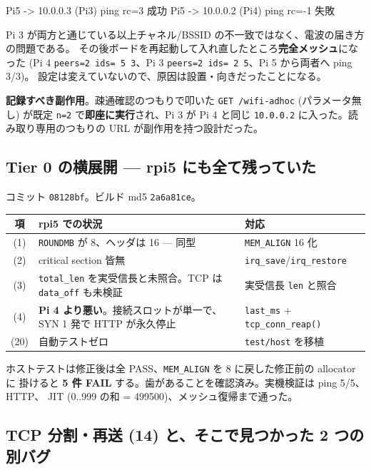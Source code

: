 \documentclass[a4paper,11pt]{ltjsarticle}
\begin{document}
\begin{code}
Pi5 -> 10.0.0.3 (Pi3)  ping rc=3   成功
Pi5 -> 10.0.0.2 (Pi4)  ping rc=-1  失敗
\end{code}

Pi 3 が両方と通じている以上チャネル/BSSID の不一致ではなく、電波の届き方の問題である。
その後ボードを再起動して入れ直したところ\textbf{完全メッシュ}になった
(Pi 4 \texttt{peers=2 ids= 5 3}、Pi 3 \texttt{peers=2 ids= 2 5}、Pi 5 から両者へ ping 3/3)。
設定は変えていないので、原因は設置・向きだったことになる。

\textbf{記録すべき副作用}。疎通確認のつもりで叩いた \texttt{GET /wifi-adhoc}
(パラメータ無し) が既定 \texttt{n=2} で\textbf{即座に実行}され、Pi 3 が Pi 4 と同じ
\texttt{10.0.0.2} に入った。読み取り専用のつもりの URL が副作用を持つ設計だった。

\subsection{Tier 0 の横展開 --- rpi5 にも全て残っていた}

コミット \texttt{08128bf}。ビルド md5 \texttt{2a6a81ce}。

\begin{center}\small
\begin{longtable}{@{}c p{8.6cm} p{4.2cm}@{}}
\toprule
\textbf{項} & \textbf{rpi5 での状況} & \textbf{対応}\\ \midrule
\endhead
(1) & \texttt{ROUNDMB} が 8、ヘッダは 16 --- 同型 & \texttt{MEM\_ALIGN} 16 化\\
(2) & critical section 皆無 & \texttt{irq\_save}/\texttt{irq\_restore}\\
(3) & \texttt{total\_len} を実受信長と未照合。TCP は \texttt{data\_off} も未検証 & 実受信長 \texttt{len} と照合\\
(4) & \textbf{Pi 4 より悪い}。接続スロットが単一で、SYN 1 発で HTTP が永久停止 & \texttt{last\_ms} + \texttt{tcp\_conn\_reap()}\\
(20) & 自動テストゼロ & \texttt{test/host} を移植\\
\bottomrule
\end{longtable}
\end{center}

ホストテストは修正後は全 PASS、\texttt{MEM\_ALIGN} を 8 に戻した修正前の allocator に
掛けると \textbf{5 件 FAIL} する。歯があることを確認済み。実機検証は ping 5/5、HTTP、
JIT (0..999 の和 = 499500)、メッシュ復帰まで通った。

\subsection{TCP 分割・再送 (14) と、そこで見つかった 2 つの別バグ}
\end{document}
